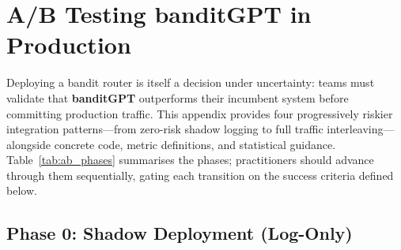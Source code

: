 
\section{A/B Testing banditGPT in Production}
\label{app:ab_testing}

Deploying a bandit router is itself a decision under uncertainty: teams must validate that \textbf{banditGPT} outperforms their incumbent system before committing production traffic.
This appendix provides four progressively riskier integration patterns---from zero-risk shadow logging to full traffic interleaving---alongside concrete code, metric definitions, and statistical guidance.
Table~\ref{tab:ab_phases} summarises the phases; practitioners should advance through them sequentially, gating each transition on the success criteria defined below.

\begin{table}[htbp]
\centering
\caption{A/B testing phases for production adoption of banditGPT.}
\label{tab:ab_phases}
\small
{}
\end{table}


\subsection{Phase 0: Shadow Deployment (Log-Only)}
\label{app:ab_shadow}

